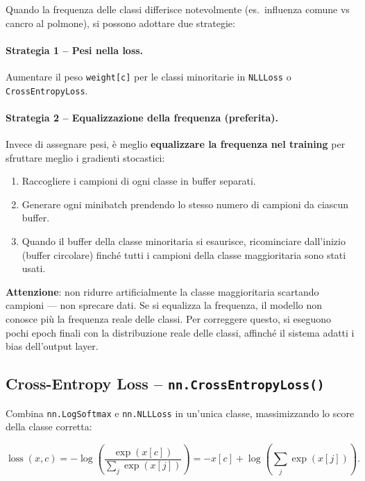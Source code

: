 Quando la frequenza delle classi differisce notevolmente (es.\ influenza comune vs
cancro al polmone), si possono adottare due strategie:

\paragraph{Strategia 1 -- Pesi nella loss.}
Aumentare il peso \texttt{weight[c]} per le classi minoritarie in \texttt{NLLLoss}
o \texttt{CrossEntropyLoss}.

\paragraph{Strategia 2 -- Equalizzazione della frequenza (preferita).}
Invece di assegnare pesi, è meglio \textbf{equalizzare la frequenza nel training}
per sfruttare meglio i gradienti stocastici:
\begin{enumerate}
  \item Raccogliere i campioni di ogni classe in buffer separati.
  \item Generare ogni minibatch prendendo lo stesso numero di campioni da ciascun
        buffer.
  \item Quando il buffer della classe minoritaria si esaurisce, ricominciare
        dall'inizio (buffer circolare) finché tutti i campioni della classe
        maggioritaria sono stati usati.
\end{enumerate}

\textbf{Attenzione}: non ridurre artificialmente la classe maggioritaria scartando
campioni --- non sprecare dati. Se si equalizza la frequenza, il modello non
conosce più la frequenza reale delle classi. Per correggere questo, si eseguono
pochi epoch finali con la distribuzione reale delle classi, affinché il sistema
adatti i bias dell'output layer.

\subsection{Cross-Entropy Loss -- \texttt{nn.CrossEntropyLoss()}}
\label{subsec:cross-entropy}

Combina \texttt{nn.LogSoftmax} e \texttt{nn.NLLLoss} in un'unica classe,
massimizzando lo score della classe corretta:

\begin{equation}
  \operatorname{loss}(x, c) =
  -\log\!\left(\frac{\exp(x[c])}{\sum_j \exp(x[j])}\right)
  = -x[c] + \log\!\left(\sum_j \exp(x[j])\right).
\end{equation}

